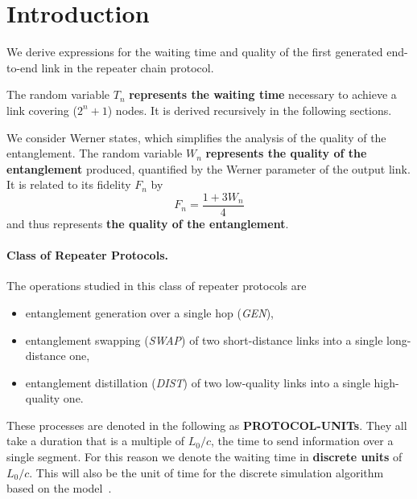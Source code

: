 \documentclass{masterthesis}
\begin{document}
\section{Introduction}

We derive expressions for the waiting time and quality of the first generated end-to-end link in the repeater chain protocol.

The random variable $T_{n}$ \textbf{represents the waiting time} necessary to achieve a link covering ($2^{n}+1$) nodes. 
It is derived recursively in the following sections.

We consider Werner states, which simplifies the analysis of the quality of the entanglement. %
The random variable $W_{n}$ \textbf{represents the quality of the entanglement} produced, quantified by the Werner parameter of the output link. It is related to its fidelity $F_{n}$ by %
\begin{equation}
    F_{n} = \frac{1 + 3 W_{n}}{4}
\end{equation}
and thus represents \textbf{the quality of the entanglement}.


\paragraph*{Class of Repeater Protocols.}

The operations studied in this class of repeater protocols are
\begin{itemize}
    \item entanglement generation over a single hop (\textit{GEN}),
    \item entanglement swapping (\textit{SWAP}) of two short-distance links into a single long-distance one,
    \item entanglement distillation (\textit{DIST}) of two low-quality links into a single high-quality one.
\end{itemize}
These processes are denoted in the following as \textbf{PROTOCOL-UNITs}. They all take a duration that is a multiple of ${L_0}/{c}$, the time to send information over a single segment. For this reason we denote the waiting time in \textbf{discrete units} of ${L_0}/{c}$. 
This will also be the unit of time for the discrete simulation algorithm based on the model~\cite{Li_2021}.
\end{document}
